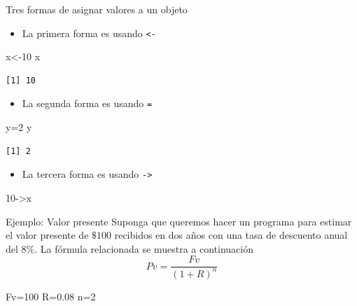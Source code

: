 \documentclass[
  ignorenonframetext,
  aspectratio=169,
  spanish,
]{beamer}
\newenvironment{Shaded}{\begin{snugshade}}{\end{snugshade}}
\newcommand{\DecValTok}[1]{\textcolor[rgb]{0.68,0.00,0.00}{#1}}
\newcommand{\FloatTok}[1]{\textcolor[rgb]{0.68,0.00,0.00}{#1}}
\newcommand{\NormalTok}[1]{\textcolor[rgb]{0.00,0.23,0.31}{#1}}
\newcommand{\OtherTok}[1]{\textcolor[rgb]{0.00,0.23,0.31}{#1}}
\providecommand{\tightlist}{%
  \setlength{\itemsep}{0pt}\setlength{\parskip}{0pt}}
\begin{document}
\begin{frame}[fragile]{Tres formas de asignar valores a un objeto}
\label{tres-formas-de-asignar-valores-a-un-objeto}
\begin{itemize}
\tightlist
\item
  La primera forma es usando \texttt{\textless{}-}
\end{itemize}

\begin{Shaded}
\begin{Highlighting}[]
\NormalTok{x}\OtherTok{\textless{}{-}}\DecValTok{10}
\NormalTok{x}
\end{Highlighting}
\end{Shaded}

\begin{verbatim}
[1] 10
\end{verbatim}

\begin{itemize}
\tightlist
\item
  La segunda forma es usando \texttt{=}
\end{itemize}

\begin{Shaded}
\begin{Highlighting}[]
\NormalTok{y}\OtherTok{=}\DecValTok{2}
\NormalTok{y}
\end{Highlighting}
\end{Shaded}

\begin{verbatim}
[1] 2
\end{verbatim}

\begin{itemize}
\tightlist
\item
  La tercera forma es usando \texttt{-\textgreater{}}
\end{itemize}

\begin{Shaded}
\begin{Highlighting}[]
\DecValTok{10}\OtherTok{{-}\textgreater{}}\NormalTok{x}
\end{Highlighting}
\end{Shaded}
\end{frame}

\begin{frame}[fragile]{Ejemplo: Valor presente}
\label{ejemplo-valor-presente}
Suponga que queremos hacer un programa para estimar el valor presente de
\(\$ 100\) recibidos en dos años con una tasa de descuento anual del
\(8\%\). La fórmula relacionada se muestra a continuación
\[Pv=\frac{Fv}{(1+R)^n}\]

\begin{Shaded}
\begin{Highlighting}[]
\NormalTok{Fv}\OtherTok{=}\DecValTok{100}
\NormalTok{R}\OtherTok{=}\FloatTok{0.08}
\NormalTok{n}\OtherTok{=}\DecValTok{2}
\end{Highlighting}
\end{Shaded}
\end{frame}
\end{document}
